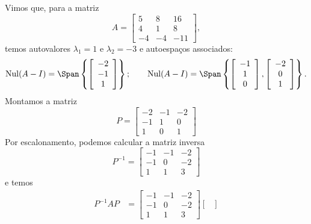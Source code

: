 \begin{ex}\label{exp:3x3denovo}
	Vimos que, para a matriz
	\begin{equation}
	A =
	\left[
	\begin{array}{ccc}
	5 & 8 & 16 \\
	4 & 1 & 8 \\
	-4 & -4 & -11
	\end{array}
	\right],
	\end{equation} temos autovalores $\lambda_1 = 1$ e $\lambda_2 = -3$ e autoespaços associados:
	\begin{equation}
	\operatorname{Nul} (A - I) = \Span \left\{ \left[
	\begin{array}{c}
	-2 \\
	-1 \\
	1
	\end{array}
	\right] \right\}; \qquad \operatorname{Nul} (A - I) = \Span \left\{ \left[
	\begin{array}{c}
	-1 \\
	1 \\
	0
	\end{array}
	\right], \left[
	\begin{array}{ccc}
	-2 \\
	0 \\
	1
	\end{array}
	\right] \right\}.
	\end{equation} Montamos a matriz
	\begin{equation}
	P =
	\begin{bmatrix}
	-2 & -1 & -2 \\
	-1 & 1 & 0 \\
	1 & 0 & 1
	\end{bmatrix}
	\end{equation} Por escalonamento, podemos calcular a matriz inversa
	\begin{equation}
	P^{-1} =
	\begin{bmatrix}
	-1 & -1 &-2 \\
	-1 & 0 & -2 \\
	1&1&3
	\end{bmatrix}
	\end{equation} e temos
          \begin{align*}
	P^{-1} A P & =
	\begin{bmatrix}
	-1 & -1 & -2 \\
	-1 & 0 & -2 \\
	1&1&3
	\end{bmatrix}
	\begin{bmatrix}

\end{bmatrix}
\end{align*}
\end{ex}

